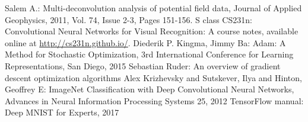 \documentclass{article}
\begin{document}
\begin{thebibliography}{References}
Salem A.: Multi-deconvolution analysis of potential field data, Journal of Applied Geophysics, 2011, Vol. 74, Issue 2-3, Pages 151-156.
S class CS231n: Convolutional Neural Networks for Visual Recognition: A course notes, available online at \href{http://cs231n.github.io/}{http://cs231n.github.io/}.
Diederik P. Kingma, Jimmy Ba: Adam: A Method for Stochastic Optimization, 3rd International Conference for Learning Representations, San Diego, 2015
Sebastian Ruder: An overview of gradient descent optimization algorithms
Alex Krizhevsky and Sutskever, Ilya and Hinton, Geoffrey E: ImageNet Classification with Deep Convolutional Neural Networks, Advances in Neural Information Processing Systems 25, 2012
TensorFlow manual: Deep MNIST for Experts, 2017

\end{thebibliography}
\end{document}
